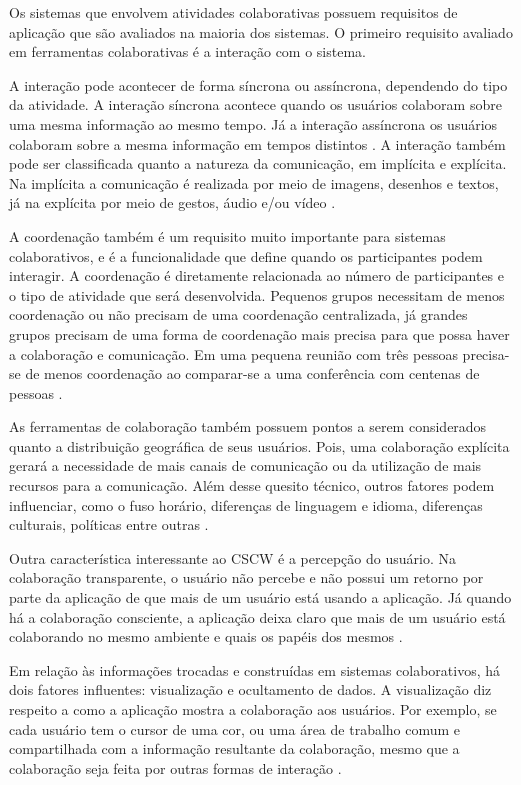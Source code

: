 Os sistemas que envolvem atividades colaborativas possuem requisitos de aplicação que são avaliados na maioria dos sistemas. O primeiro requisito avaliado em ferramentas colaborativas é a interação com o sistema.

A interação pode acontecer de forma síncrona ou assíncrona, dependendo do tipo da atividade. A interação síncrona acontece quando os usuários colaboram sobre uma mesma informação ao mesmo tempo. Já a interação assíncrona os usuários colaboram sobre a mesma informação em tempos distintos \cite{reinhard_cscw_1994}. A interação também pode ser classificada quanto a natureza da comunicação, em implícita e explícita. Na implícita a comunicação é realizada por meio de imagens, desenhos e textos, já na explícita por meio de gestos, áudio e/ou vídeo \cite{schmidt_taking_1992}.

A coordenação também é um requisito muito importante para sistemas colaborativos, e é a funcionalidade que define quando os participantes podem interagir. A coordenação é diretamente relacionada ao número de participantes e o tipo de atividade que será desenvolvida. Pequenos grupos necessitam de menos coordenação ou não precisam de uma coordenação centralizada, já grandes grupos precisam de uma forma de coordenação mais precisa para que possa haver a colaboração e comunicação. Em uma pequena reunião com três pessoas precisa-se de menos coordenação ao comparar-se a uma conferência com centenas de pessoas \cite{reinhard_cscw_1994}.

As ferramentas de colaboração também possuem pontos a serem considerados quanto a distribuição geográfica de seus usuários. Pois, uma colaboração explícita gerará a necessidade de mais canais de comunicação ou da utilização de mais recursos para a comunicação. Além desse quesito técnico, outros fatores podem influenciar, como o fuso horário, diferenças de linguagem e idioma, diferenças culturais, políticas entre outras \cite{reinhard_cscw_1994}.

Outra característica interessante ao CSCW é a percepção do usuário. Na colaboração transparente, o usuário não percebe e não possui um retorno por parte da aplicação de que mais de um usuário está usando a aplicação. Já quando há a colaboração consciente, a aplicação deixa claro que mais de um usuário está colaborando no mesmo ambiente e quais os papéis dos mesmos \cite{reinhard_cscw_1994}.

Em relação às informações trocadas e construídas em sistemas colaborativos, há dois fatores influentes: visualização e ocultamento de dados. A visualização diz respeito a como a aplicação mostra a colaboração aos usuários. Por exemplo, se cada usuário tem o cursor de uma cor, ou uma área de trabalho comum e compartilhada com a informação resultante da colaboração, mesmo que a colaboração seja feita por outras formas de interação \cite{reinhard_cscw_1994}.

